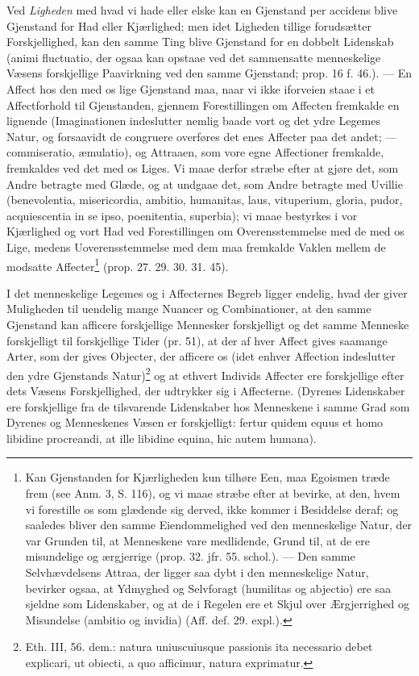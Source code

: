 \documentclass[12pt,a4paper]{book}
\newcommand{\opage}[1]{\marginnote{\footnotesize\textit{[#1]}}}
\begin{document}
Ved \emph{Ligheden} med hvad vi hade eller elske kan
en Gjenstand per accidens blive Gjenstand for Had eller
Kjærlighed; men idet Ligheden tillige forudsætter Forskjellighed,
kan den samme Ting blive Gjenstand for en dobbelt
Lidenskab (animi fluctuatio, der ogsaa kan opstaae ved det
sammensatte menneskelige Væsens forskjellige Paavirkning
ved den samme Gjenstand; prop. 16 f. 46.). --- En Affect
hos den med os lige Gjenstand maa, naar vi ikke iforveien
staae i et Affectforhold til Gjenstanden, gjennem Forestillingen
om Affecten fremkalde en lignende (Imaginationen
indeslutter nemlig baade vort og det ydre Legemes Natur,
og forsaavidt de congruere overføres det enes Affecter paa
det andet; --- commiseratio, æmulatio), og Attraaen, som
\opage{118} \setcounter{footnote}{0}%
vore egne Affectioner fremkalde, fremkaldes ved det med
os Liges. Vi maae derfor stræbe efter at gjøre det, som
Andre betragte med Glæde, og at undgaae det, som Andre
betragte med Uvillie (benevolentia, misericordia, ambitio,
humanitas, laus, vituperium, gloria, pudor, acquiescentia in
se ipso, poenitentia, superbia); vi maae bestyrkes i vor
Kjærlighed og vort Had ved Forestillingen om Overensstemmelse
med de med os Lige, medens Uoverensstemmelse
med dem maa fremkalde Vaklen mellem de modsatte
Affecter\footnote{Kan Gjenstanden for Kjærligheden kun tilhøre
Een, maa Egoismen træde frem (see Anm. 3, S. 116), og
vi maae stræbe efter at bevirke, at den, hvem vi forestille os
som glædende sig derved, ikke kommer i Besiddelse deraf; og
saaledes bliver den samme Eiendommelighed ved den
menneskelige Natur, der var Grunden til, at Menneskene
vare medlidende, Grund til, at de ere misundelige og
ærgjerrige (prop. 32. jfr. 55. schol.). --- Den samme
Selvhævdelsens Attraa, der ligger saa dybt i den menneskelige
Natur, bevirker ogsaa, at Ydmyghed og Selvforagt (humilitas
og abjectio) ere saa sjeldne som Lidenskaber, og at de i
Regelen ere et Skjul over Ærgjerrighed og Misundelse
(ambitio og invidia) (Aff. def. 29. expl.).} (prop. 27. 29. 30. 31. 45).

I det menneskelige Legemes og i Affecternes Begreb
ligger endelig, hvad der giver Muligheden til uendelig mange
Nuancer og Combinationer, at den samme Gjenstand kan
afficere forskjellige Mennesker forskjelligt og det samme
Menneske forskjelligt til forskjellige Tider (pr. 51), at der
af hver Affect gives saamange Arter, som der gives Objecter,
der afficere os (idet enhver Affection indeslutter den
ydre Gjenstands
Natur)\footnote{Eth. III, 56. dem.: natura uniuscuiusque
passionis ita necessario debet explicari, ut obiecti, a quo
afficimur, natura exprimatur.} og at ethvert Individs Affecter
ere forskjellige efter dets Væsens Forskjellighed, der udtrykker
sig i Affecterne. (Dyrenes Lidenskaber ere forskjellige
fra de tilsvarende Lidenskaber hos Menneskene i samme
Grad som Dyrenes og Menneskenes Væsen er forskjelligt:
fertur quidem equus et homo libidine procreandi, at ille
libidine equina, hic autem humana).
\end{document}
